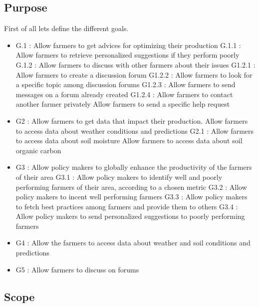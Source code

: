\subsection{Purpose}
First of all lets define the different goals.

\begin{itemize}
	\item
	G.1 : Allow farmers to get advices for optimizing their production
	\subitem
	G.1.1 : Allow farmers to retrieve personalized suggestions if they perform poorly
	\subitem
	G.1.2 : Allow farmers to discuss with other farmers about their issues
	\subitem
	G1.2.1 : Allow farmers to create a discussion forum
	\subitem
	G1.2.2 : Allow farmers to look for a specific topic among discussion forums
	\subitem
	G1.2.3 : Allow farmers to send messages on a forum already created
	\subitem
	G1.2.4 : Allow farmers to contact another farmer privately	
	Allow farmers to send a specific help request
	\item
	G2 : Allow farmers to get data that impact their production. 
	Allow farmers to access data about weather conditions and predictions
	\subitem
	G2.1 :
	Allow farmers to access data about soil moisture
	Allow farmers to access data about soil organic carbon
	\item
	G3 : Allow policy makers to globally enhance the productivity of the farmers of their area
	\subitem
	G3.1 : Allow policy makers to identify well and poorly performing farmers of their area, according to a chosen metric
	\subitem
	G3.2 : Allow policy makers to incent well performing farmers
	\subitem
	G3.3 : Allow policy makers to fetch best practices among farmers and provide them to others
	\subitem
	G3.4 : Allow policy makers to send personalized suggestions to poorly performing farmers
	\item
	G4 : Allow the farmers to access data about weather and soil conditions and predictions
	\item
	G5 : Allow farmers to discuss on forums
	
\end{itemize}

\subsection{Scope}

